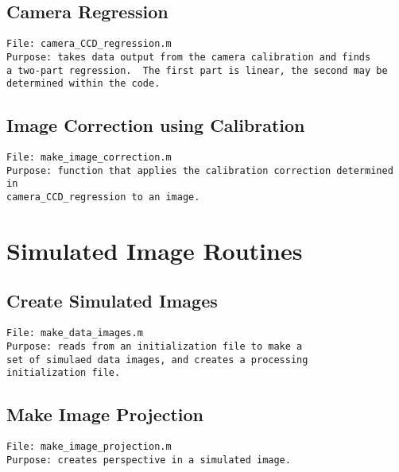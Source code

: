 
\pagebreak

\pagebreak
\subsection{Camera Regression}
\begin{verbatim} 
File: camera_CCD_regression.m
Purpose: takes data output from the camera calibration and finds 
a two-part regression.  The first part is linear, the second may be
determined within the code.  
\end{verbatim}


\pagebreak

\subsection{Image Correction using Calibration}
\begin{verbatim} 
File: make_image_correction.m
Purpose: function that applies the calibration correction determined in 
camera_CCD_regression to an image.  
\end{verbatim}




\pagebreak
\section{Simulated Image Routines}
\label{simulated_image_routines}

\subsection{Create Simulated Images}
\begin{verbatim} 
File: make_data_images.m
Purpose: reads from an initialization file to make a 
set of simulaed data images, and creates a processing 
initialization file.
\end{verbatim}


\pagebreak

\subsection{Make Image Projection}
\begin{verbatim} 
File: make_image_projection.m
Purpose: creates perspective in a simulated image.
\end{verbatim}

